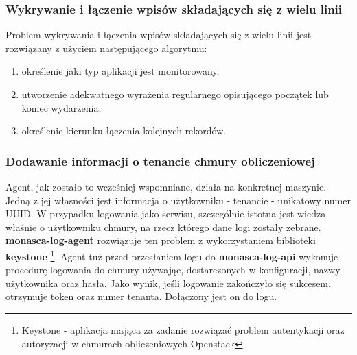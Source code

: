         \subsubsection{Wykrywanie i łączenie wpisów składających się z wielu linii}
            Problem wykrywania i łączenia wpisów składających się z wielu linii jest rozwiązany z użyciem następującego algorytmu:
            \begin{enumerate}
                \item określenie jaki typ aplikacji jest monitorowany,
                \item utworzenie adekwatnego wyrażenia regularnego opisującego początek lub koniec wydarzenia,
                \item określenie kierunku łączenia kolejnych rekordów.
            \end{enumerate}
            
            
        \subsubsection{Dodawanie informacji o tenancie chmury obliczeniowej}
            Agent, jak zostało to wcześniej wspomniane, działa na konkretnej maszynie. Jedną z jej własności jest
            informacja o użytkowniku - tenancie - unikatowy numer UUID. W przypadku logowania jako serwisu,
            szczególnie istotna jest wiedza właśnie o użytkowniku chmury, na rzecz którego dane logi zostały
            zebrane. \textbf{monasca-log-agent} rozwiązuje ten problem z wykorzystaniem biblioteki \textbf{keystone}
            \footnote{Keystone - aplikacja mająca za zadanie rozwiązać problem autentykacji oraz autoryzacji w
                chmurach obliczeniowych Openstack}. 
            Agent tuż przed przesłaniem logu do \textbf{monasca-log-api} wykonuje procedurę logowania do chmury
            używając, dostarczonych w konfiguracji, nazwy użytkownika oraz hasła. Jako wynik, jeśli logowanie 
            zakończyło się sukcesem, otrzymuje token oraz numer tenanta. Dołączony jest on do logu.
            
